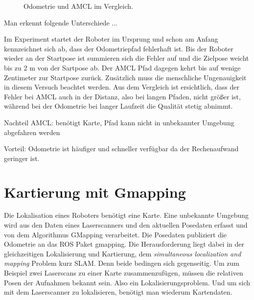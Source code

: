 \documentclass[11pt,a4paper]{article}
\begin{document}
{\begin{figure}[h]
	\centering
	\par\medskip
	\caption{ Odometrie und AMCL im Vergleich. }
\end{figure}




Man erkennt folgende Unterschiede ...

Im Experiment startet der Roboter im Ursprung und schon am Anfang kennzeichnet sich ab, dass der Odometriepfad fehlerhaft ist. Bis der Roboter wieder an der Startpose ist summieren sich die Fehler auf und die Zielpose weicht bis zu 2 m von der Sartpose ab. Der AMCL Pfad dagegen kehrt bis auf wenige Zentimeter zur Startpose zur\"uck. Zus\"atzlich muss die menschliche Ungenauigkeit in diesem Versuch beachtet werden. Aus dem Vergleich ist ersichtlich, dass der Fehler bei AMCL auch in der Distanz, also bei langen Pfaden, nicht gr\"oßer ist, w\"ahrend bei der Odometrie bei langer Laufzeit die Qualit\"at stetig abnimmt.


Nachteil AMCL: benötigt Karte, Pfad kann nicht in unbekannter Umgebung abgefahren werden

Vorteil: Odometrie ist h\"aufiger und schneller verf\"ugbar da der Rechenaufwand geringer ist. 


\section{Kartierung mit Gmapping} \cite{gmapping}
Die Lokalisation eines Roboters ben\"otigt eine Karte. Eine unbekannte Umgebung wird aus den Daten eines Laserscanners und den aktuellen Posedaten erfasst und von dem Algorithmus GMapping verarbeitet. Die Posedaten publiziert die Odometrie an das ROS Paket gmapping.
Die Herausforderung liegt dabei in der gleichzeitigen Lokalisierung und Kartierung, dem \textit{simultaneous localization and mapping} Problem kurz SLAM. Denn beide bedingen sich gegenseitig. Um zum Beispiel zwei Laserscans zu einer Karte zusammenzuf\"ugen, m\"ussen die relativen Posen der Aufnahmen bekannt sein. Also ein Lokalisierungsproblem. Und um sich mit dem Laserscanner zu lokalisieren, ben\"otigt man wiederum Kartendaten. 



}
\end{document}
